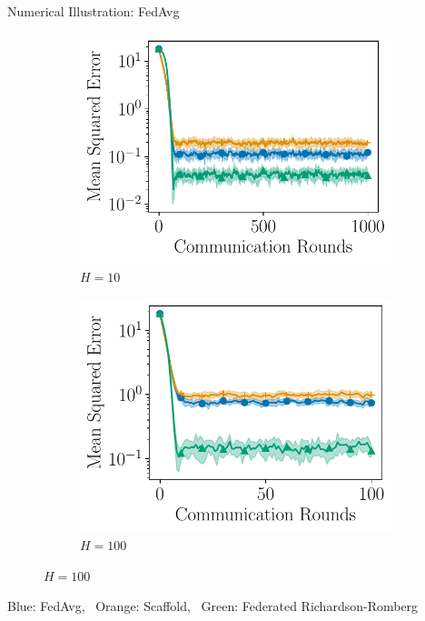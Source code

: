 \documentclass[aspectratio=169,12pt]{beamer}
\begin{document}
\begin{frame}{Numerical Illustration: FedAvg}
\begin{figure}[t]
    \centering
     \begin{subfigure}[b]{0.45\linewidth}
         \centering
         \includegraphics[width=\textwidth]{images/plots/heterogeneous_iterates_10.pdf}
         \caption{$H=10$}
     \end{subfigure}
     \begin{subfigure}[b]{0.45\linewidth}
         \centering
         \includegraphics[width=\textwidth]{images/plots/heterogeneous_iterates_100.pdf}
         \caption{$H=100$}
     \end{subfigure}
     \end{figure}
     \vspace{-1em}
     \begin{center}
     Blue: FedAvg,~
     Orange: Scaffold,~
     Green: Federated Richardson-Romberg
     \end{center}
\end{frame}
\end{document}
